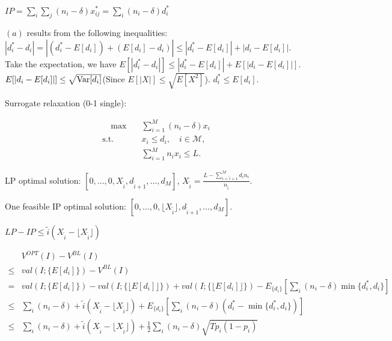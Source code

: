 $IP = \sum_{i} \sum_{j} (n_{i} - \delta) x_{ij}^{*} = \sum_{i} (n_{i} - \delta) d_{i}^{*}$

$(a)$ results from the following inequalities: $|d_{i}^{*} -d_{i}| = |(d_{i}^{*}-E[d_{i}]) + (E[d_{i}] -d_{i})| \leq |d_{i}^{*}-E[d_{i}]| + |d_{i} - E[d_{i}]|$. Take the expectation, we have $E[|d_{i}^{*} -d_{i}|]\leq |d_{i}^{*}-E[d_{i}]| + E[|d_{i} - E[d_{i}]|]$. $E[|d_{i} - E[d_{i}]|] \leq \sqrt{\operatorname{{Var}}[d_{i}]}$(Since $E[|X|] \leq \sqrt{E[X^{2}]}$). $d_{i}^{*} \leq E[d_{i}]$.




Surrogate relaxation (0-1 single):

\begin{align}\label{one_row}
    \quad \max \quad & \sum_{i = 1}^{M} (n_i - \delta) x_{i} \\
    \text {s.t.} \quad & x_{i} \leq d_{i}, \quad i \in \mathcal{M},  \\ 
    & \sum_{i=1}^{M} n_{i} x_{i} \leq L.  
\end{align}

LP optimal solution: $[0, \ldots, 0, X_{\tilde{i}}, d_{\tilde{i}+1}, \ldots, d_{M}]$, $X_{\tilde{i}} = \frac{L - \sum_{i = \tilde{i}+1}^{M} {d_i n_i}}{n_{\tilde{i}}}.$

One feasible IP optimal solution: $[0, \ldots, 0, \lfloor X_{\tilde{i}} \rfloor, d_{\tilde{i}+1}, \ldots, d_{M}]$.

$LP - IP \leq \tilde{i} (X_{\tilde{i}} - \lfloor X_{\tilde{i}} \rfloor)$


\begin{align*}
    & V^{OPT}(I) - V^{BL}(I) \\
 \leq & val(I; \{E[d_{i}]\}) - V^{BL}(I) \\
 = & val(I; \{E[d_{i}]\}) - val(I; \{\lfloor E[d_{i}]\rfloor\}) + val(I; \{\lfloor E[d_{i}]\rfloor\}) - E_{\{d_{i}\}}[\sum_{i} (n_{i}-\delta) \min\{d_{i}^{*}, d_{i}\}] \\
 \leq & \sum_{i} (n_{i} - \delta) + \tilde{i} (X_{\tilde{i}} - \lfloor X_{\tilde{i}} \rfloor) + E_{\{d_{i}\}}[\sum_{i} (n_{i}-\delta) (d_{i}^{*} - \min\{d_{i}^{*}, d_{i}\})] \\
 \leq & \sum_{i} (n_{i} - \delta) + \tilde{i} (X_{\tilde{i}} - \lfloor X_{\tilde{i}} \rfloor) + \frac{1}{2} \sum_{i} (n_{i}-\delta) \sqrt{T p_{i} (1- p_{i})}
 \end{align*}
 

